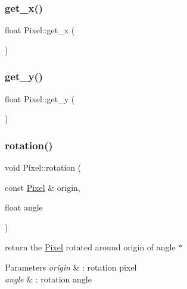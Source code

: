 \mbox{\label{class_pixel_abfcc199906820cbdd1fb4c833db4084b}} 
\subsubsection{\texorpdfstring{get\+\_\+x()}{get\_x()}}
{\footnotesize\ttfamily float Pixel\+::get\+\_\+x (\begin{DoxyParamCaption}{ }\end{DoxyParamCaption})}

\mbox{\label{class_pixel_a477538b4154f2d6986e54bae001e3655}} 
\subsubsection{\texorpdfstring{get\+\_\+y()}{get\_y()}}
{\footnotesize\ttfamily float Pixel\+::get\+\_\+y (\begin{DoxyParamCaption}{ }\end{DoxyParamCaption})}

\mbox{\label{class_pixel_a1909b90317d44b2e24e4f20fde94509a}} 
\subsubsection{\texorpdfstring{rotation()}{rotation()}}
{\footnotesize\ttfamily void Pixel\+::rotation (\begin{DoxyParamCaption}\item[{const \hyperlink{class_pixel}{Pixel} \&}]{origin,  }\item[{float}]{angle }\end{DoxyParamCaption})}



return the \hyperlink{class_pixel}{Pixel} rotated around origin of angle $\ast$ 


\begin{DoxyParams}{Parameters}
{\em origin} & \+: rotation pixel \\
\hline
{\em angle} & \+: rotation angle \\
\hline
\end{DoxyParams}
\mbox{\label{class_pixel_aede90013c4a336131bd26e1a10b62aae}} 
